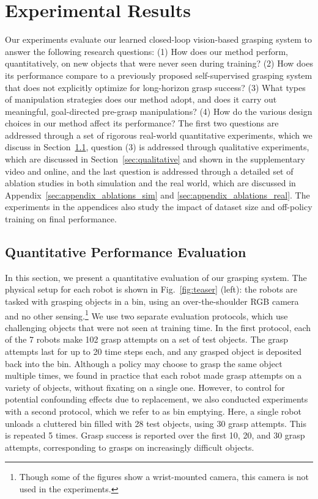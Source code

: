 \documentclass{article}
\begin{document}
\section{Experimental Results}
\label{sec:experiments}

Our experiments evaluate our learned closed-loop vision-based grasping system to answer the following research questions: (1) How does our method perform, quantitatively, on new objects that were never seen during training? (2) How does its performance compare to a previously proposed self-supervised grasping system that does not explicitly optimize for long-horizon grasp success? (3) What types of manipulation strategies does our method adopt, and does it carry out meaningful, goal-directed pre-grasp manipulations?
(4) How do the various design choices in our method affect its performance? The first two questions are addressed through a set of rigorous real-world quantitative experiments, which we discuss in Section~\ref{sec:quantitative}, question (3) is addressed through qualitative experiments, which are discussed in Section~\ref{sec:qualitative} and shown in the supplementary video and online,
and the last question is addressed through a detailed set of ablation studies in both simulation and the real world, which are discussed in Appendix~\ref{sec:appendix_ablations_sim} and \ref{sec:appendix_ablations_real}. The experiments in the appendices also study the impact of dataset size and off-policy training on final performance.

\subsection{Quantitative Performance Evaluation}
\label{sec:quantitative}

In this section, we present a quantitative evaluation of our grasping system. The physical setup for each robot is shown in Fig.~\ref{fig:teaser} (left): the robots are tasked with grasping objects in a bin, using an over-the-shoulder RGB camera and no other sensing.\footnote{Though some of the figures show a wrist-mounted camera, this camera is not used in the experiments.} We use two separate evaluation protocols, which use challenging objects that were not seen at training time. In the first protocol, each of the 7 robots make 102 grasp attempts on a set of test objects. The grasp attempts last for up to 20 time steps each, and any grasped object is deposited back into the bin. Although a policy may choose to grasp the same object multiple times, we found in practice that each robot made grasp attempts on a variety of objects, without fixating on a single one. However, to control for potential confounding effects due to replacement, we also conducted experiments with a second protocol, which we refer to as bin emptying. Here, a single robot unloads a cluttered bin filled with 28 test objects,
using 30 grasp attempts. This is repeated 5 times. Grasp success is reported over the first 10, 20, and 30 grasp attempts, corresponding to grasps on increasingly difficult objects.
\end{document}

